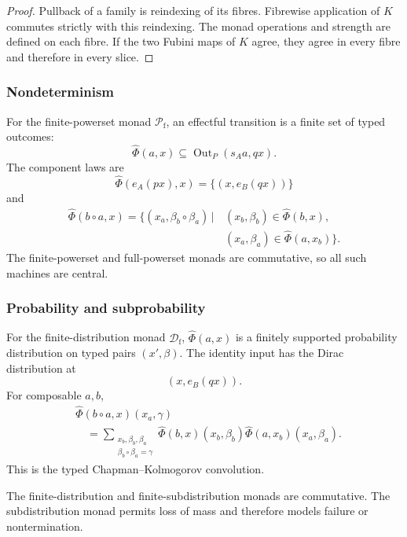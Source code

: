 \begin{proof}
Pullback of a family is reindexing of its fibres.  Fibrewise application of
\(K\) commutes strictly with this reindexing.  The monad operations and
strength are defined on each fibre.  If the two Fubini maps of \(K\) agree,
they agree in every fibre and therefore in every slice.
\end{proof}

\subsubsection{Nondeterminism}

For the finite-powerset monad \(\mathcal P_{\mathrm f}\), an effectful
transition is a finite set of typed outcomes:
\[
    \widehat\Phi(a,x)
    \subseteq
    \operatorname{Out}_P(s_Aa,qx).
\]
The component laws are
\[
    \widehat\Phi(e_A(px),x)
    =
    \{(x,e_B(qx))\}
\]
and
\[
\begin{aligned}
\widehat\Phi(b\circ a,x)
=
\bigl\{
    (x_a,\beta_b\circ\beta_a)
    \,\big|\,
    &(x_b,\beta_b)\in\widehat\Phi(b,x),
    \\
    &(x_a,\beta_a)\in\widehat\Phi(a,x_b)
\bigr\}.
\end{aligned}
\]
The finite-powerset and full-powerset monads are commutative, so all such
machines are central.

\subsubsection{Probability and subprobability}

For the finite-distribution monad \(\mathcal D_{\mathrm f}\),
\(\widehat\Phi(a,x)\) is a finitely supported probability distribution on
typed pairs \((x',\beta)\).  The identity input has the Dirac distribution at
\[
    (x,e_B(qx)).
\]
For composable \(a,b\),
\[
\begin{aligned}
&
\widehat\Phi(b\circ a,x)(x_a,\gamma)
\\
&\quad=
\sum_{\substack{
    x_b,\beta_b,\beta_a\\
    \beta_b\circ\beta_a=\gamma
}}
\widehat\Phi(b,x)(x_b,\beta_b)
\widehat\Phi(a,x_b)(x_a,\beta_a).
\end{aligned}
\]
This is the typed Chapman--Kolmogorov convolution.

The finite-distribution and finite-subdistribution monads are commutative.
The subdistribution monad permits loss of mass and therefore models failure
or nontermination.

